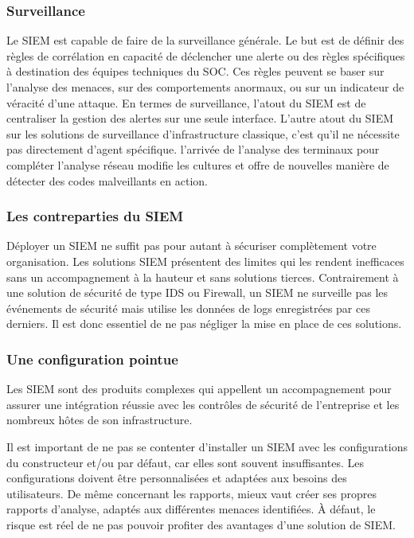 \subsubsection{ Surveillance}
Le SIEM est capable de faire de la surveillance générale. Le but est de définir des règles de corrélation en capacité de déclencher une alerte ou des règles spécifiques à destination des équipes techniques du SOC. Ces règles peuvent se baser sur l’analyse des menaces, sur des comportements anormaux, ou sur un indicateur de véracité d’une attaque. En termes de surveillance, l’atout du SIEM est de centraliser la gestion des alertes sur une seule interface. 
L’autre atout du SIEM sur les solutions de surveillance d’infrastructure classique, c’est qu’il ne nécessite pas directement d'agent spécifique. l'arrivée de l'analyse des terminaux pour compléter l'analyse réseau  modifie les cultures et offre de nouvelles manière de détecter des codes malveillants en action. 


\subsubsection{Les contreparties du SIEM}
Déployer un SIEM ne suffit pas pour autant à sécuriser complètement votre organisation. Les solutions SIEM présentent des limites qui les rendent inefficaces sans un accompagnement à la hauteur et sans solutions tierces. Contrairement à une solution de sécurité de type IDS ou Firewall, un SIEM ne surveille pas les événements de sécurité mais utilise les données de logs enregistrées par ces derniers. Il est donc essentiel de ne pas négliger la mise en place de ces solutions. 


\subsubsection{Une configuration pointue }
Les SIEM sont des produits complexes qui appellent un accompagnement pour assurer une intégration réussie avec les contrôles de sécurité de l’entreprise et les nombreux hôtes de son infrastructure. 

Il est important de ne pas se contenter d’installer un SIEM avec les configurations du constructeur et/ou par défaut, car elles sont souvent insuffisantes. Les configurations doivent être personnalisées et adaptées aux besoins des utilisateurs. De même concernant les rapports, mieux vaut créer ses propres rapports d’analyse, adaptés aux différentes menaces identifiées. À défaut, le risque est réel de ne pas pouvoir profiter des avantages d’une solution de SIEM. 

